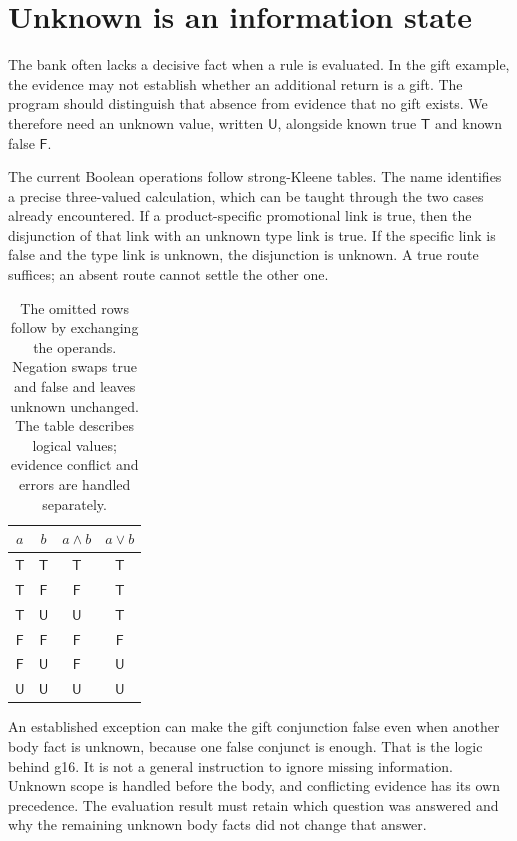 \documentclass[12pt,a4paper,oneside,openany]{book}
\newcommand{\True}{\mathsf{T}}
\newcommand{\False}{\mathsf{F}}
\newcommand{\Unknown}{\mathsf{U}}
\begin{document}
\section{Unknown is an information state}
\label{merge:M03:05}

\label{sec:proof-unknown}
The bank often lacks a decisive fact when a rule is evaluated. In the gift
example, the evidence may not establish whether an additional return is a gift.
The program should distinguish that absence from evidence that no gift exists.
We therefore need an unknown value, written $\Unknown$, alongside known true
$\True$ and known false $\False$.

The current Boolean operations follow strong-Kleene tables. The name identifies
a precise three-valued calculation, which can be taught through the two cases
already encountered. If a product-specific promotional link is true, then the
disjunction of that link with an unknown type link is true. If the specific
link is false and the type link is unknown, the disjunction is unknown. A true
route suffices; an absent route cannot settle the other one.

\begin{table}[htbp]
\centering
\begin{tabular}{cc|cc}
\toprule
$a$ & $b$ & $a\land b$ & $a\lor b$\\
\midrule
$\True$ & $\True$ & $\True$ & $\True$\\
$\True$ & $\False$ & $\False$ & $\True$\\
$\True$ & $\Unknown$ & $\Unknown$ & $\True$\\
$\False$ & $\False$ & $\False$ & $\False$\\
$\False$ & $\Unknown$ & $\False$ & $\Unknown$\\
$\Unknown$ & $\Unknown$ & $\Unknown$ & $\Unknown$\\
\bottomrule
\end{tabular}
\caption{The omitted rows follow by exchanging the operands. Negation swaps
true and false and leaves unknown unchanged. The table describes logical values;
evidence conflict and errors are handled separately.}
\label{tab:kleene}
\end{table}

An established exception can make the gift conjunction false even when another
body fact is unknown, because one false conjunct is enough. That is the logic
behind g16. It is not a general instruction to ignore missing information.
Unknown scope is handled before the body, and conflicting evidence has its own
precedence. The evaluation result must retain which question was answered and
why the remaining unknown body facts did not change that answer.
\end{document}
